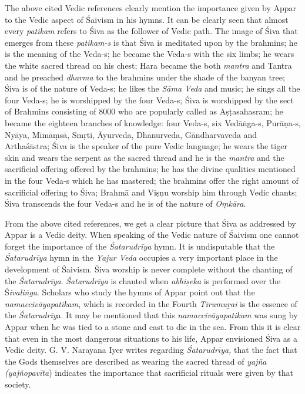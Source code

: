 \newpage

The above cited Vedic references clearly mention the importance given by Appar to the Vedic aspect of Śaivism in his hymns. It can be clearly seen that almost every \textit{patikam} refers to Śiva as the follower of Vedic path. The image of Śiva that emerges from these \textit{patikam-s} is that Śiva is meditated upon by the brahmins; he is the meaning of the Veda-s; he became the Veda-s with the six limbs; he wears the white sacred thread on his chest; Hara became the both \textit{mantra} and Tantra and he preached \textit{dharma} to the brahmins under the shade of the banyan tree; Śiva is of the nature of Veda-s; he likes the \textit{Sāma Veda} and music; he sings all the four Veda-s; he is worshipped by the four Veda-s; Śiva is worshipped by the sect of Brahmins consisting of 8000 who are popularly called as Aṣṭasahasram; he became the eighteen branches of knowledge: four Veda-s, six Vedāṅga-s, Purāṇa-s, Nyāya, Mīmāṃsā, Smṛti, Āyurveda, Dhanurveda, Gāndharvaveda and Arthaśāstra; Śiva is the speaker of the pure Vedic language; he wears the tiger skin and wears the serpent as the sacred thread and he is the \textit{mantra} and the sacrificial offering offered by the brahmins; he has the divine qualities mentioned in the four Veda-s which he has mastered; the brahmins offer the right amount of sacrificial offering to Śiva; Brahmā and Viṣṇu worship him through Vedic chants; Śiva transcends the four Veda-s and he is of the nature of \textit{Oṃkāra}.

From the above cited references, we get a clear picture that Śiva as addressed by Appar is a Vedic deity. When speaking of the Vedic nature of Śaivism one cannot forget the importance of the \textit{Śatarudrīya} hymn. It is undisputable that the \textit{Śatarudrīya} hymn in the \textit{Yajur Veda} occupies a very important place in the development of Śaivism. Śiva worship is never complete without the chanting of the \textit{Śatarudrīya}. \textit{Śatarudrīya} is chanted when \textit{abhiṣeka }is performed over the Ś\textit{ivaliṅga}. Scholars who study the hymns of Appar point out that the \textit{namaccivāyapatikam}, which is recorded in the Fourth \textit{Tirumuṟai} is the essence of the \textit{Śatarudrīy}a. It may be mentioned that this \textit{namaccivāyapatikam }was sung by Appar when he was tied to a stone and cast to die in the sea. From this it is clear that even in the most dangerous situations to his life, Appar envisioned Śiva as a Vedic deity. G. V. Narayana Iyer writes regarding \textit{Śatarudrīya,} that the fact that the Gods themselves are described as wearing the sacred thread of \textit{yajña (yajñopavīta}) indicates the importance that sacrificial rituals were given by that society.

